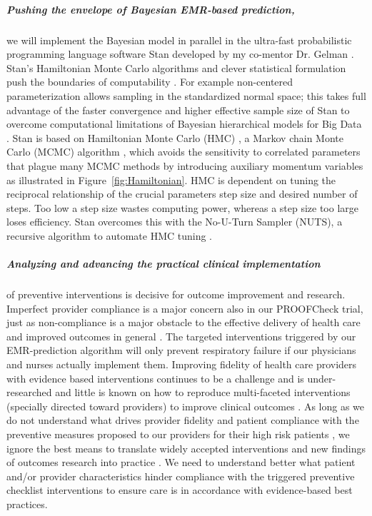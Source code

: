 \documentclass[11pt,notitlepage]{article}
\begin{document}
\subparagraph{Pushing the envelope of Bayesian EMR-based prediction,}
we will implement the Bayesian model in parallel in the ultra-fast probabilistic programming language software Stan developed by my co-mentor Dr. Gelman \cite{Stan_Software_2014}. Stan's Hamiltonian Monte Carlo algorithms \cite{Stan_Software_2014} and clever statistical formulation push the boundaries of computability \cite{Gelman-Hill_2014}. For example non-centered parameterization allows sampling in the standardized normal space; this takes full advantage of the faster convergence and higher effective sample size of Stan to overcome computational limitations of Bayesian hierarchical models for Big Data \cite{Gelman-Hill_2014}. Stan  is based on Hamiltonian Monte Carlo (HMC) \cite{Gelman-Hill_2014}, a Markov chain Monte Carlo (MCMC) algorithm \cite{StanislawUlam_1949}, which avoids the sensitivity to correlated parameters that plague many MCMC methods by introducing auxiliary momentum variables \cite{Homan_Gelman_NUTS_2014} as illustrated in Figure~\ref{fig:Hamiltonian}. HMC is dependent on tuning the reciprocal relationship of the crucial parameters step size and desired number of steps. Too low a step size wastes computing power, whereas a step size too large loses efficiency. Stan overcomes this with the No-U-Turn Sampler (NUTS), a recursive algorithm to automate HMC tuning \cite{Homan_Gelman_NUTS_2014}.

\subparagraph*{Analyzing and advancing the practical clinical implementation} of preventive interventions is decisive for outcome improvement and research. Imperfect provider compliance is a major concern also in our PROOFCheck trial, just as non-compliance is a major obstacle to the effective delivery of health care and improved outcomes in general
\cite{Duncan_16710766}. The targeted interventions triggered by our EMR-prediction algorithm will only prevent respiratory failure if our physicians and nurses actually implement them. Improving fidelity of health care providers with evidence based interventions continues to be a challenge and is under-researched \cite{Davis_7650822} and little is known on how to reproduce multi-faceted interventions (specially directed toward providers) to improve clinical outcomes \cite{Campbell_10987780}. As long as we do not understand what drives provider fidelity and patient compliance with the preventive measures proposed to our providers for their high risk patients  \cite{Mittman_15172904}, we ignore the best means to translate widely accepted interventions and new findings of outcomes research into practice \cite{Glasgow_17150029}. We need to understand better what patient and/or provider characteristics hinder compliance with the triggered preventive checklist interventions to ensure care is in accordance with evidence-based best practices.
\end{document}
